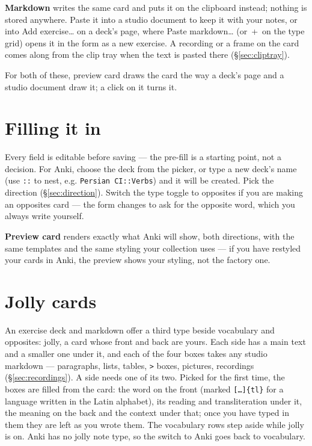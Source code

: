 \documentclass[11pt,oneside]{report}
\newcommand{\key}[1]{\textsf{\small\fbox{#1}}}
\newcommand{\menu}[1]{\textsf{#1}}
\begin{document}
\textbf{Markdown} writes the same card and puts it on the clipboard instead;
nothing is stored anywhere. Paste it into a studio document to keep it with
your notes, or into \menu{Add exercise\ldots} on a deck's page, where
\menu{Paste markdown\ldots} (or \key{Ctrl}\,+\,\key{V} on the type grid) opens
it in the form as a new exercise. A recording or a frame on the card comes
along from the clip tray when the text is pasted there
(\S\ref{sec:cliptray}).

For both of these, \menu{preview card} draws the card the way a deck's page
and a studio document draw it; a click on it turns it.

\section{Filling it in}

Every field is editable before saving --- the pre-fill is a starting point,
not a decision. For Anki, choose the deck from the picker, or type a new
deck's name (use \texttt{::} to nest, e.g. \texttt{Persian CI::Verbs}) and
it will be created. Pick the direction (\S\ref{sec:direction}).
Switch the type toggle to \menu{opposites} if you are making an opposites
card --- the form changes to ask for the opposite word, which you always
write yourself.

\textbf{Preview card} renders exactly what Anki will show, both directions,
with the same templates and the same styling your collection uses --- if you
have restyled your cards in Anki, the preview shows your styling, not the
factory one.

\section{Jolly cards}
\label{sec:jolly}

An exercise deck and markdown offer a third type beside vocabulary and
opposites: \menu{jolly}, a card whose front and back are yours. Each side
has a main text and a smaller one under it, and each of the four boxes takes
any studio markdown --- paragraphs, lists, tables, \texttt{>} boxes,
pictures, recordings (\S\ref{sec:recordings}). A side needs one of its two.
Picked for the first time, the boxes are filled from the card: the word on
the front (marked \texttt{[\ldots]\{tl\}} for a language written in the
Latin alphabet), its reading and transliteration under it, the meaning on
the back and the context under that; once you have typed in them they are
left as you wrote them. The vocabulary rows step aside while jolly is on.
Anki has no jolly note type, so the switch to \menu{Anki} goes back to
vocabulary.
\end{document}
